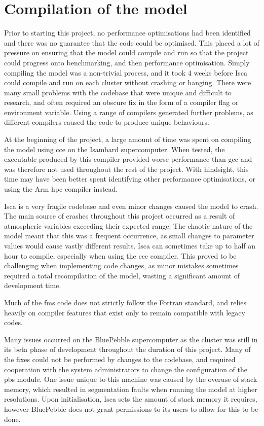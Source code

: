 \documentclass[a4paper,11pt]{report}
\begin{document}
\section{Compilation of the model}
Prior to starting this project, no performance optimisations had been identified and there was no guarantee that the code could be optimised. This placed a lot of pressure on ensuring that the model could compile and run so that the project could progress onto benchmarking, and then performance optimisation. Simply compiling the model was a non-trivial process, and it took 4 weeks before Isca could compile and run on each cluster without crashing or hanging. There were many small problems with the codebase that were unique and difficult to research, and often required an obscure fix in the form of a compiler flag or environment variable. Using a range of compilers generated further problems, as different compilers caused the code to produce unique behaviours.
\par
At the beginning of the project, a large amount of time was spent on compiling the model using \gls{cce} on the Isambard supercomputer. When tested, the executable produced by this compiler provided worse performance than \gls{gcc} and was therefore not used throughout the rest of the project. With hindsight, this time may have been better spent identifying other performance optimisations, or using the Arm \gls{hpc} compiler instead.
\par
Isca is a very fragile codebase and even minor changes caused the model to crash. The main source of crashes throughout this project occurred as a result of atmospheric variables exceeding their expected range. The chaotic nature of the model meant that this was a frequent occurrence, as small changes to parameter values would cause vastly different results. Isca can sometimes take up to half an hour to compile, especially when using the \gls{cce}
compiler. This proved to be challenging when implementing code changes, as minor mistakes sometimes required a total recompilation of the model, wasting a significant amount of development time. 
\par
Much of the \gls{fms} code does not strictly follow the Fortran standard, and relies heavily on compiler features that exist only to remain compatible with legacy codes.
\par
Many issues occurred on the BluePebble supercomputer as the cluster was still in its beta phase of development throughout the duration of this project. Many of the fixes could not be performed by changes to the codebase, and required cooperation with the system administrators to change the configuration of the \gls{pbs} module. One issue unique to this machine was caused by the overuse of stack memory, which resulted in segmentation faults when running the model at higher resolutions. Upon initialisation, Isca sets the amount of stack memory it requires, however BluePebble does not grant permissions to its users to allow for this to be done.
\end{document}
